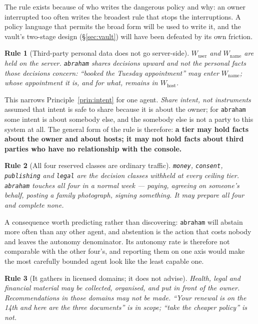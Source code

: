 \documentclass[11pt]{article}
\newtheorem{drule}{Rule}
\newcommand{\code}[1]{\texttt{\small #1}}
\begin{document}
The rule exists because of who writes the dangerous policy and why: an owner interrupted too often writes the broadest rule that stops the interruptions. A policy language that permits the broad form will be used to write it, and the vault's two-stage design (\S\ref{sec:vault}) will have been defeated by its own friction.

\begin{drule}[Third-party personal data does not go server-side]
\label{rule:thirdparty}
$W_{\text{user}}$ and $W_{\text{name}}$ are held on the server. \code{abraham} shares \emph{decisions} upward and not the personal facts those decisions concern: \emph{``booked the Tuesday appointment''} may enter $W_{\text{name}}$; whose appointment it is, and for what, remains in $W_{\text{host}}$.
\end{drule}

This narrows Principle~\ref{prin:intent} for one agent. \emph{Share intent, not instruments} assumed that intent is safe to share because it is about the owner; for \code{abraham} some intent is about somebody else, and the somebody else is not a party to this system at all. The general form of the rule is therefore: \textbf{a tier may hold facts about the owner and about hosts; it may not hold facts about third parties who have no relationship with the console.}

\begin{drule}[All four reserved classes are ordinary traffic]
\label{rule:reserved}
\code{money}, \code{consent}, \code{publishing} and \code{legal} are the decision classes withheld at every ceiling tier. \code{abraham} touches all four in a normal week --- paying, agreeing on someone's behalf, posting a family photograph, signing something. It may \emph{prepare} all four and \emph{complete} none.
\end{drule}

A consequence worth predicting rather than discovering: \code{abraham} will abstain more often than any other agent, and abstention is the action that costs nobody and leaves the autonomy denominator. Its autonomy rate is therefore not comparable with the other four's, and reporting them on one axis would make the most carefully bounded agent look like the least capable one.

\begin{drule}[It gathers in licensed domains; it does not advise]
\label{rule:advice}
Health, legal and financial material may be collected, organised, and put in front of the owner. Recommendations in those domains may not be made. \emph{``Your renewal is on the 14th and here are the three documents''} is in scope; \emph{``take the cheaper policy''} is not.
\end{drule}
\end{document}
